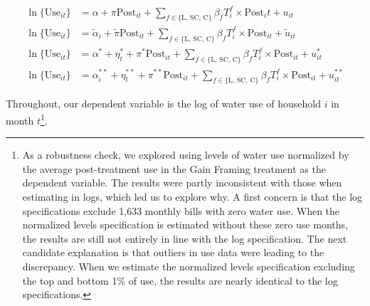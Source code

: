 \documentclass[12pt]{article}%
\begin{document}
\begin{align}
\ln\{\text{Use}_{it}\} &= \alpha + \pi \text{Post}_{it} + \displaystyle\sum_{f \in \{\text{L, SC, C}\}} \beta_f T^f_{i} \times \text{Post}_it +  u_{it}  \\
\ln\{\text{Use}_{it}\} &= \tilde{\alpha}_i + \tilde{\pi} \text{Post}_{it} + \displaystyle\sum_{f \in \{\text{L, SC, C}\}} \beta_f T^f_{i} \times \text{Post}_{it} + \tilde{u}_{it} \\
\ln\{\text{Use}_{it}\} &= \alpha^* + \eta_t^* + \pi^{*} \text{Post}_{it} + \displaystyle\sum_{f \in \{\text{L, SC, C}\}} \beta_f T^f_{i} \times \text{Post}_{it} + u^*_{it} \\
\ln\{\text{Use}_{it}\} &= \alpha_i^{**} + \eta_t^{**} + \pi^{**} \text{Post}_{it} + \displaystyle\sum_{f \in \{\text{L, SC, C}\}} \beta_f T^f_{i} \times \text{Post}_{it} + u^{**}_{it}
\end{align}

Throughout, our dependent variable is the log of water use of household $i$ in month $t$\footnote{As a robustness check, we explored using levels of water use normalized by the average post-treatment use in the Gain Framing treatment as the dependent variable. The results were partly inconsistent with those when estimating in logs, which led us to explore why. A first concern is that the log specifications exclude 1,633 monthly bills with zero water use. When the normalized levels specification is estimated without these zero use months, the results are still not entirely in line with the log specification. The next candidate explanation is that outliers in use data were leading to the discrepancy. When we estimate the normalized levels specification excluding the top and bottom 1\% of use, the results are nearly identical to the log specifications.}.


\end{document}
